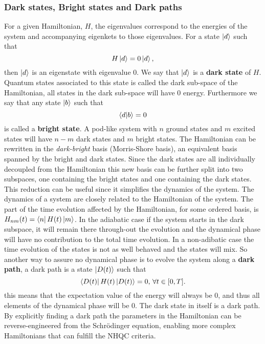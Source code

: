 \subsubsection{Dark states, Bright states and Dark paths}
For a given Hamiltonian, $H$, the eigenvalues correspond to the energies of the system and accompanying eigenkets to those eigenvalues. For a state $\ket{d}$ such that 
\begin{equation}
H\ket{d} = 0\ket{d},
\end{equation}
then $\ket{d}$ is an eigenstate with eigenvalue $0$. We say that $\ket{d}$ is a \textbf{dark state} of $H$. Quantum states associated to this state is called the dark sub-space of the Hamiltonian, all states in the dark sub-space will have $0$ energy. Furthermore we say that any state $\ket{b}$ such that 
\begin{equation}
\bra{d}\ket{b} = 0
\end{equation}
is called a \textbf{bright state}. A pod-like system with $n$ ground states and $m$ excited states will have $n-m$ dark states and $m$ bright states\cite{lambda}.
The Hamiltonian can be rewritten in the \textit{dark-bright} basis (Morris-Shore basis), an equivalent basis spanned by the bright and dark states. Since the dark states are all individually decoupled from the Hamiltonian this new basis can be further split into two subspaces, one containing the bright states and one containing the dark states. This reduction can be useful since it simplifies the dynamics of the system. 
The dynamics of a system are closely related to the Hamiltonian of the system. The part of the time evolution affected by the Hamiltonian, for some ordered basis, is $H_{nm}(t) = \bra{n}H(t)\ket{m}$. In the adiabatic case if the system starts in the dark subspace, it will remain there through-out the evolution and the dynamical phase will have no contribution to the total time evolution. In a non-adibatic case the time evolution of the states is not as well behaved and the states will mix. So another way to assure no dynamical phase is to evolve the system along a \textbf{dark path}, a dark path is a state $\ket{D(t)}$ such that 
\begin{equation}
\bra{D(t)}H(t)\ket{D(t)} = 0, \, \forall t\in[0,T].
\end{equation}
this means that the expectation value of the energy will always be $0$, and thus all elements of the dynamical phase will be $0$. The dark state in itself is a dark path. By explicitly finding a dark path the parameters in the Hamiltonian can be reverse-engineered from the Schrödinger equation, enabling more complex Hamiltonians that can fulfill the NHQC criteria.




